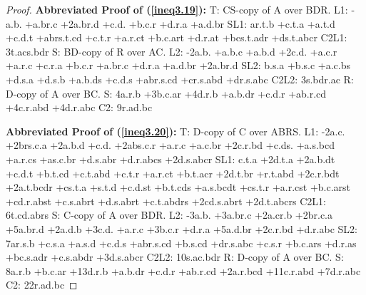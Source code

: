 \documentclass[10pt,journal]{IEEEtran}
\begin{document}
\begin{proof}
{\bf Abbreviated Proof of (\ref{ineq3.19}):}
T: CS-copy of A over BDR.\newline
L1: -a.b. +a.br.c +2a.br.d +c.d. +b.c.r +d.r.a +a.d.br\newline
SL1: ar.t.b +c.t.a +a.t.d +c.d.t +abrs.t.cd +c.t.r +a.r.ct +b.c.art +d.r.at +bcs.t.adr +ds.t.abcr
C2L1: 3t.acs.bdr\newline
S: BD-copy of R over AC.\newline
L2: -2a.b. +a.b.c +a.b.d +2c.d. +a.c.r +a.r.c +c.r.a +b.c.r +a.br.c +d.r.a +a.d.br +2a.br.d\newline
SL2: b.s.a +b.s.c +a.c.bs +d.s.a +d.s.b +a.b.ds +c.d.s +abr.s.cd +cr.s.abd +dr.s.abc\newline
C2L2: 3s.bdr.ac\newline
R: D-copy of A over BC.\newline
S: 4a.r.b +3b.c.ar +4d.r.b +a.b.dr +c.d.r +ab.r.cd +4c.r.abd +4d.r.abc\newline
C2: 9r.ad.bc\newline


{\bf Abbreviated Proof of (\ref{ineq3.20}):}
T: D-copy of C over ABRS.\newline
L1: -2a.c. +2brs.c.a +2a.b.d +c.d. +2abs.c.r +a.r.c +a.c.br +2c.r.bd +c.ds. +a.s.bcd +a.r.cs +as.c.br +d.s.abr +d.r.abcs +2d.s.abcr\newline
SL1: c.t.a +2d.t.a +2a.b.dt +c.d.t +b.t.cd +c.t.abd +c.t.r +a.r.ct +b.t.acr +2d.t.br +r.t.abd +2c.r.bdt +2a.t.bcdr +cs.t.a +s.t.d +c.d.st +b.t.cds +a.s.bcdt +cs.t.r +a.r.cst +b.c.arst +cd.r.abst +c.s.abrt +d.s.abrt +c.t.abdrs +2cd.s.abrt +2d.t.abcrs
C2L1: 6t.cd.abrs\newline
S: C-copy of A over BDR.\newline
L2: -3a.b. +3a.br.c +2a.cr.b +2br.c.a +5a.br.d +2a.d.b +3c.d. +a.r.c +3b.c.r +d.r.a +5a.d.br +2c.r.bd +d.r.abc\newline
SL2: 7ar.s.b +c.s.a +a.s.d +c.d.s +abr.s.cd +b.s.cd +dr.s.abc +c.s.r +b.c.ars +d.r.as +bc.s.adr +c.s.abdr +3d.s.abcr\newline
C2L2: 10s.ac.bdr\newline
R: D-copy of A over BC.\newline
S: 8a.r.b +b.c.ar +13d.r.b +a.b.dr +c.d.r +ab.r.cd +2a.r.bcd +11c.r.abd +7d.r.abc\newline
C2: 22r.ad.bc\newline


\end{proof}
\end{document}
